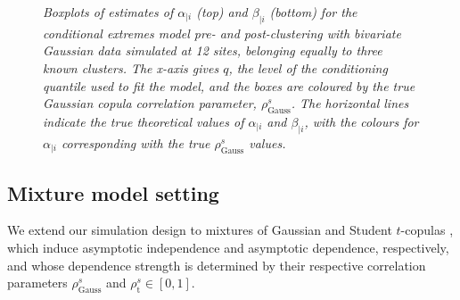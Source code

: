 \documentclass[12pt,compact]{article}
\newcommand{\rhou}[1]{\rho_{\text{#1}}}
\begin{document}
\begin{figure}[htb]
    \caption{\emph{ 
    Boxplots of estimates of $\alpha_{\mid i}$ (top) and $\beta_{\mid i}$ (bottom) for the conditional extremes model pre- and post-clustering with bivariate Gaussian data simulated at 12 sites, belonging equally to three known clusters. 
    The x-axis gives $q$, the level of the conditioning quantile used to fit the model, and the boxes are coloured by the true Gaussian copula correlation parameter, $\rho_{\text{Gauss}}^s$.
    The horizontal lines indicate the true theoretical values of $\alpha_{\mid i}$ and $\beta_{\mid i}$, with the colours for $\alpha_{\mid i}$ corresponding with the true $\rho_{\text{Gauss}}^s$ values.
    }}
   \label{fig:00_gauss_cop}
\end{figure}


\subsection{Mixture model setting}
\label{subsec:sim_mixture}


We extend our simulation design to mixtures of Gaussian and Student $t$-copulas \citep{Demarta2007-ap}, which induce asymptotic independence and asymptotic dependence, respectively, and whose dependence strength is determined by their respective correlation parameters $\rho_{\text{Gauss}}^s$ and $\rho_{\text{t}}^s \in [0, 1]$.
\end{document}
